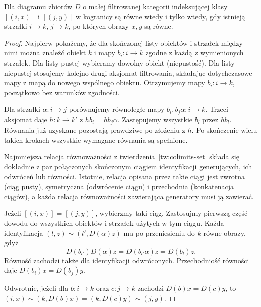 \begin{lemat}\label{cat:lem:filtered-equality}
Dla diagramu zbiorów $D$ o małej filtrowanej kategorii indeksującej klasy $[(i,x)]$ i $[(j,y)]$ w kogranicy są równe wtedy i tylko wtedy, gdy istnieją strzałki $i\to k$, $j\to k$, po których obrazy $x,y$ są równe.
\end{lemat}
\begin{proof}
Najpierw pokażemy, że dla skończonej listy obiektów i strzałek między nimi można znaleźć obiekt $k$ i mapy $b_i:i\to k$ zgodne z każdą z wymienionych strzałek. Dla listy pustej wybieramy dowolny obiekt (niepustość). Dla listy niepustej stosujemy kolejno drugi aksjomat filtrowania, składając dotychczasowe mapy z mapą do nowego wspólnego obiektu. Otrzymujemy mapy $b_i:i\to k$, początkowo bez warunków zgodności.

Dla strzałki $\alpha:i\to j$ porównujemy równoległe mapy $b_i,b_j\alpha:i\to k$. Trzeci aksjomat daje $h:k\to k'$ z $hb_i=hb_j\alpha$. Zastępujemy wszystkie $b_l$ przez $hb_l$. Równania już uzyskane pozostają prawdziwe po złożeniu z $h$. Po skończenie wielu takich krokach wszystkie wymagane równania są spełnione.

Najmniejsza relacja równoważności z twierdzenia~\ref{tw:colimits-set} składa się dokładnie z par połączonych skończonym ciągiem identyfikacji generujących, ich odwróceń lub równości. Istotnie, relacja opisana przez takie ciągi jest zwrotna (ciąg pusty), symetryczna (odwrócenie ciągu) i przechodnia (konkatenacja ciągów), a każda relacja równoważności zawierająca generatory musi ją zawierać.

Jeżeli $[(i,x)]=[(j,y)]$, wybierzmy taki ciąg. Zastosujmy pierwszą część dowodu do wszystkich obiektów i strzałek użytych w tym ciągu. Każda identyfikacja $(l,z)\sim(l',D(\alpha)z)$ ma po przeniesieniu do $k$ równe obrazy, gdyż
\[
D(b_{l'})D(\alpha)z=D(b_{l'}\alpha)z=D(b_l)z.
\]
Równość zachodzi także dla identyfikacji odwróconych. Przechodniość równości daje $D(b_i)x=D(b_j)y$.

Odwrotnie, jeżeli dla $b:i\to k$ oraz $c:j\to k$ zachodzi $D(b)x=D(c)y$, to $(i,x)\sim(k,D(b)x)=(k,D(c)y)\sim(j,y)$.
\end{proof}

